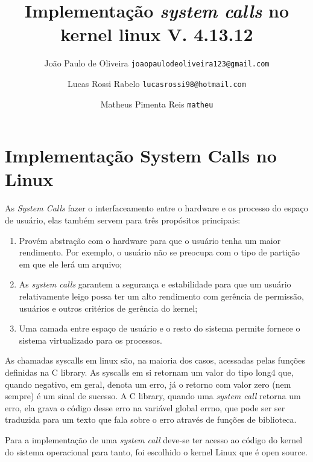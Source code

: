 \documentclass[12pt]{article}
\begin{document}
\title{Implementação \textit{system calls} no kernel linux V. 4.13.12\vspace{3.5cm}} %

\author{
	João Paulo de Oliveira
	\texttt{joaopaulodeoliveira123@gmail.com}
	\and
	Lucas Rossi Rabelo
	\texttt{lucasrossi98@hotmail.com}
	\and		
	Matheus Pimenta Reis
	\texttt{matheu}
	\vspace*{9cm}
}

\maketitle
\tableofcontents

\pagebreak
\section*{Implementação \textbf{System Calls} no Linux}
As \textit{System Calls} fazer o interfaceamento entre o hardware e os processo do espaço de usuário, elas também servem para três propósitos principais:
\begin{enumerate}
	\item Provém abstração com o hardware para que o usuário tenha um maior rendimento. Por exemplo, o usuário não se preocupa com o tipo de partição em que ele lerá um arquivo;
	\item As \textit{system calls} garantem a segurança e estabilidade para que um usuário relativamente leigo possa ter um alto rendimento com gerência de permissão, usuários e outros critérios de gerência do kernel;
	\item Uma camada entre espaço de usuário e o resto do sistema permite fornece o sistema virtualizado para os processos.
\end{enumerate}
	As chamadas syscalls em linux são, na maioria dos casos, acessadas pelas funções definidas na C library. As syscalls em si retornam um valor do tipo long4 que, quando negativo, em geral, denota um erro, já o retorno com valor zero (nem sempre) é um sinal de sucesso. A C library, quando uma \textit{system call} retorna um erro, ela grava o código desse erro na variável global errno, que pode ser ser traduzida para um texto que fala sobre o erro através de funções de biblioteca.
	
	Para a implementação de uma \textit{system call} deve-se ter acesso ao código do kernel do sistema operacional para tanto, foi escolhido o kernel Linux que é open source.
\end{document}
